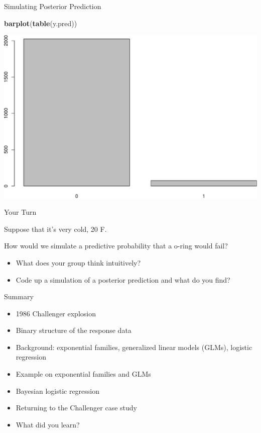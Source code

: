 \documentclass[
  ignorenonframetext,
]{beamer}
\newenvironment{Shaded}{\begin{snugshade}}{\end{snugshade}}
\newcommand{\KeywordTok}[1]{\textcolor[rgb]{0.13,0.29,0.53}{\textbf{#1}}}
\newcommand{\NormalTok}[1]{#1}
\providecommand{\tightlist}{%
  \setlength{\itemsep}{0pt}\setlength{\parskip}{0pt}}
\begin{document}
\begin{frame}[fragile]{Simulating Posterior Prediction}
\protect\hypertarget{simulating-posterior-prediction-2}{}

\begin{Shaded}
\begin{Highlighting}[]
\KeywordTok{barplot}\NormalTok{(}\KeywordTok{table}\NormalTok{(y.pred))}
\end{Highlighting}
\end{Shaded}

\includegraphics{9-logistic-regression_files/figure-beamer/unnamed-chunk-8-1.pdf}

\end{frame}

\begin{frame}{Your Turn}
\protect\hypertarget{your-turn}{}

Suppose that it's very cold, 20 F.

How would we simulate a predictive probability that a o-ring would fail?

\begin{itemize}
\tightlist
\item
  What does your group think intuitively?
\item
  Code up a simulation of a posterior prediction and what do you find?
\end{itemize}

\end{frame}

\begin{frame}{Summary}
\protect\hypertarget{summary-1}{}

\begin{itemize}
\tightlist
\item
  1986 Challenger explosion
\item
  Binary structure of the response data
\item
  Background: exponential families, generalized linear models (GLMs),
  logistic regression
\item
  Example on exponential families and GLMs
\item
  Bayesian logistic regression
\item
  Returning to the Challenger case study
\item
  What did you learn?
\end{itemize}

\end{frame}
\end{document}
